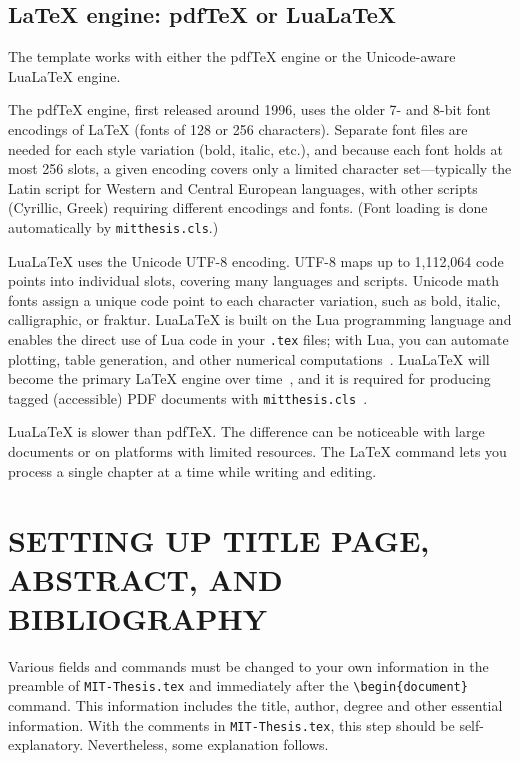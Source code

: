 \documentclass[11pt]{article}
\newcommand*\pdfTeX{pdf\TeX}
\newcommand*\LuaLaTeX{Lua\LaTeX}
\begin{document}
\subsection{\LaTeX{} engine: \pdfTeX{} or \LuaLaTeX}
The template works with either the \pdfTeX{} engine or the Unicode-aware \LuaLaTeX{} engine.  

The \pdfTeX{} engine, first released around 1996, uses the older 7- and 8-bit font encodings of \LaTeX{} (fonts of 128 or 256 characters). Separate font files are needed for each style variation (bold, italic, etc.), and because each font holds at most 256 slots, a given encoding covers only a limited character set---typically the Latin script for Western and Central European languages, with other scripts (Cyrillic, Greek) requiring different encodings and fonts. (Font loading is done automatically by \texttt{mitthesis.cls}.)

\LuaLaTeX{} uses the Unicode UTF-8 encoding. UTF-8 maps up to 1,112,064 code points into individual slots, covering many languages and scripts. Unicode math fonts assign a unique code point to each character variation, such as bold, italic, calligraphic, or fraktur. \LuaLaTeX{} is built on the Lua programming language and enables the direct use of Lua code in your \texttt{.tex} files; with Lua, you can automate plotting, table generation, and other numerical computations~\cite{montijano2014}. \LuaLaTeX{} will become the primary \LaTeX{} engine over time~\cite{latexproject2024ltnews40}, and it is required for producing tagged (accessible) PDF documents with \texttt{mitthesis.cls}~\cite{lienhard2026}.

\LuaLaTeX{} is slower than \pdfTeX.  The difference can be noticeable with large documents or on platforms with limited resources.  The \LaTeX{} \verb|| command lets you process a single chapter at a time while writing and editing.

\section{SETTING UP TITLE PAGE, ABSTRACT, AND BIBLIOGRAPHY}\label{sec:3}
Various fields and commands must be changed to your own information in the preamble of \texttt{MIT-Thesis.tex} and immediately after the \verb|\begin{document}| command. This information includes the title, author, degree and other essential information.  With the comments in \texttt{MIT-Thesis.tex}, this step should be self-explanatory. Nevertheless, some explanation follows.
\end{document}
